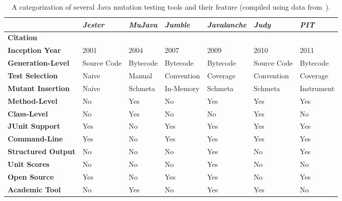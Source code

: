 \begin{table}
  \centering
  \caption{A categorization of several Java mutation testing tools and their feature (compiled using data from~\cite{PIT, MR10}).}
  \label{tab:mutation_tools}
  \begin{threeparttable}
    \begin{tabular}{|l|l|l|l|l|l|l|}
      \rowcolor[RGB]{169,196,223}
      \hline & \textbf{\emph{Jester}} & \textbf{\emph{MuJava}} & \textbf{\emph{Jumble}} & \textbf{\emph{Javalanche}} & \textbf{\emph{Judy}} & \textbf{\emph{PIT}} \\
      \hline \cellcolor[RGB]{169,196,223} \textbf{Citation} & \cite{Jester} & \cite{MOK05} & \cite{Jumble} & \cite{SZ09} & \cite{MR10} & \cite{PIT} \\
      \hline \cellcolor[RGB]{169,196,223} \textbf{Inception Year} & 2001 & 2004 & 2007 & 2009 & 2010 & 2011 \\
      \hline \cellcolor[RGB]{169,196,223} \textbf{Generation-Level} & Source Code & Bytecode & Bytecode & Bytecode & Source Code & Bytecode \\
      \hline \cellcolor[RGB]{169,196,223} \textbf{Test Selection} & Naive\tnote{f} & Manual & Convention & Coverage & Convention & Coverage \\
      \hline \cellcolor[RGB]{169,196,223} \textbf{Mutant Insertion} & Naive\tnote{f} & Schmeta & In-Memory & Schmeta & Schmeta\tnote{c} & Instrument \\
      \hline \cellcolor[RGB]{169,196,223} \textbf{Method-Level} & No & Yes & No & Yes & Yes & Yes \\
      \hline \cellcolor[RGB]{169,196,223} \textbf{Class-Level} & No & Yes & No & No & Yes\tnote{b} & No \\
      \hline \cellcolor[RGB]{169,196,223} \textbf{JUnit Support} & Yes & No\tnote{c} & Yes & Yes & Yes & Yes \\
      \hline \cellcolor[RGB]{169,196,223} \textbf{Command-Line} & Yes & No & Yes & Yes & Yes & Yes \\
      \hline \cellcolor[RGB]{169,196,223} \textbf{Structured Output} & No & No & No & Yes & No & Yes \\
      \hline \cellcolor[RGB]{169,196,223} \textbf{Unit Scores} & No & No & No & Yes & No & No\tnote{g} \\
      \hline \cellcolor[RGB]{169,196,223} \textbf{Open Source} & Yes & No\tnote{d} & Yes & Yes & No & Yes \\
      \hline \cellcolor[RGB]{169,196,223} \textbf{Academic Tool} & No & Yes & No & Yes & Yes & No \\

\end{tabular}
\end{threeparttable}
\end{table}
